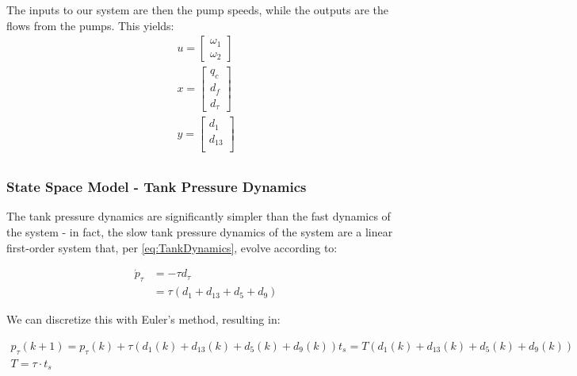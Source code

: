The inputs to our system are then the pump speeds, while the outputs are the flows from the pumps. This yields:
\begin{equation}\label{eq:StateSpaceInputsOutputsFast}
	\begin{split}
		u = \begin{bmatrix} \omega_1 \\ \omega_2	\end{bmatrix} \\
		x = \begin{bmatrix} q_c \\ d_f \\ d_{\tau}	\end{bmatrix} \\
		y = \begin{bmatrix} d_1 \\ d_{13} \\ 	\end{bmatrix} \\
	\end{split}
\end{equation}

\subsubsection{State Space Model - Tank Pressure Dynamics}
The tank pressure dynamics are significantly simpler than the fast dynamics of the system - in fact, the slow tank pressure dynamics of the system are a linear first-order system that, per \cref{eq:TankDynamics}, evolve according to:

\begin{equation}\label{eq:SlowTankDynamics}
	\begin{split}
		\dot{p}_\tau &= - \tau d_\tau \\
		&= \tau \left(d_1 + d_{13} + d_5 + d_9\right)
	\end{split}
\end{equation}

We can discretize this with Euler's method, resulting in:

\begin{equation}\label{eq:TankDynamicsDiscrete}
	\begin{gathered}
			p_\tau(k+1) = p_\tau(k) + \tau \left(d_1(k) + d_{13}(k) + d_5(k) + d_9(k)\right)t_s = T\left(d_1(k) + d_{13}(k) + d_5(k) + d_9(k)\right) \\ 
			T = \tau\cdot t_s 
	\end{gathered}
\end{equation}

